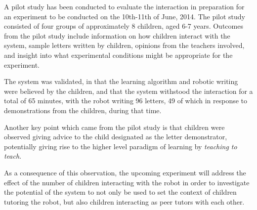\documentclass{sig-alternate}
\begin{document}

A pilot study has been conducted to evaluate the interaction in preparation for
an experiment to be conducted on the 10th-11th of June, 2014. The pilot study
consisted of four groups of approximately 8 children, aged 6-7 years. Outcomes
from the pilot study include information on how children interact with the
system, sample letters written by children, opinions from the teachers involved,
and insight into what experimental conditions might be appropriate for the
experiment. 

The system was validated, in that the learning algorithm and robotic writing
were believed by the children, and that the system withstood the interaction for
a total of 65 minutes, with the robot writing 96 letters, 49 of which in
response to demonstrations from the children, during that time. 

Another key point which came from the pilot study is that children were observed
giving advice to the child designated as the letter demonstrator, potentially
giving rise to the higher level paradigm of learning by \emph{teaching to
teach}. 

%
%
%
%

As a consequence of this observation, the upcoming experiment will address the
effect of the number of children interacting with the robot in order to
investigate the potential of the system to not only be used to set the context
of children tutoring the robot, but also children interacting as peer tutors
with each other.
\end{document}

